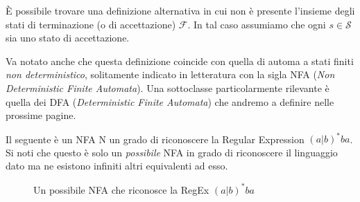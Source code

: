 \begin{remark}
    È possibile trovare una definizione alternativa in cui non è presente l'insieme degli stati di terminazione (o di accettazione) $\mathcal{F}$. In tal caso assumiamo che ogni $s \in \mathcal{S}$ sia uno stato di accettazione.
\end{remark}

\begin{remark}
    Va notato anche che questa definizione coincide con quella di automa a stati finiti \emph{non deterministico}, solitamente indicato in letteratura con la sigla NFA (\emph{Non Deterministic Finite Automata}). Una sottoclasse particolarmente rilevante è quella dei DFA (\emph{Deterministic Finite Automata}) che andremo a definire nelle prossime pagine.
\end{remark}
Il seguente è un NFA N un grado di riconoscere la Regular Expression $(a|b)^*ba$. Si noti che questo è solo un \emph{possibile} NFA in grado di riconoscere il linguaggio dato ma ne esistono infiniti altri equivalenti ad esso.
\begin{figure}[h!]
    \centering
    \caption{Un possibile NFA che riconosce la RegEx $(a|b)^*ba$}
    \label{fig:NonDeterministic_Example}
\end{figure}

